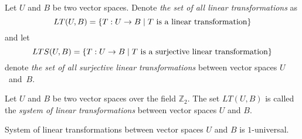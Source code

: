 \begin{definition}
\label{definition-linear-transformations}
Let $U$ and $B$ be two vector spaces. Denote \emph{the set of all linear transformations} as
\[
LT(U, B) = \{ T: U \rightarrow B \mid T \text{ is a linear transformation} \}
\]
and let
\[
LTS(U, B) = \{ T: U \rightarrow B \mid T \text{ is a surjective linear transformation} \}
\] denote \emph{the set of all surjective linear transformations} between vector spaces $U$~and~$B$.
\end{definition} 

\begin{definition}
\label{definition-system-of-linear-transformations}
Let $U$ and $B$ be two vector spaces over the field $\mathbb{Z}_2$. The set $LT(U, B)$ is called the \emph{system of linear transformations} between vector spaces $U$ and $B$.
\end{definition}
\begin{remark}
\label{remark-system-of-linear-transformations}
System of linear transformations between vector spaces $U$ and $B$ is $1$-universal.
\end{remark}
